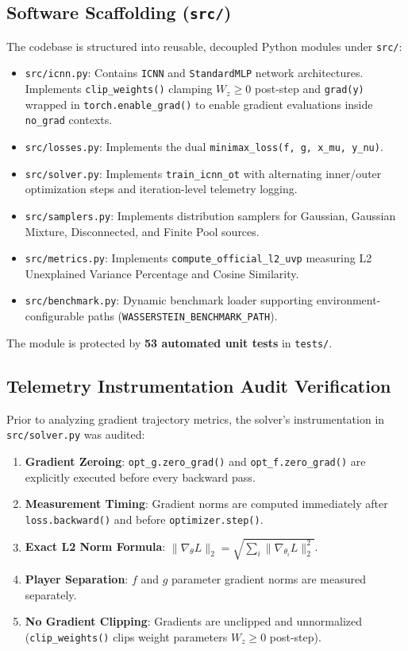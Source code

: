 \documentclass[11pt,a4paper]{article}
\begin{document}
\subsection{Software Scaffolding (\texttt{src/})}
The codebase is structured into reusable, decoupled Python modules under \texttt{src/}:
\begin{itemize}
    \item \texttt{src/icnn.py}: Contains \texttt{ICNN} and \texttt{StandardMLP} network architectures. Implements \texttt{clip\_weights()} clamping $W_z \ge 0$ post-step and \texttt{grad(y)} wrapped in \texttt{torch.enable\_grad()} to enable gradient evaluations inside \texttt{no\_grad} contexts.
    \item \texttt{src/losses.py}: Implements the dual \texttt{minimax\_loss(f, g, x\_mu, y\_nu)}.
    \item \texttt{src/solver.py}: Implements \texttt{train\_icnn\_ot} with alternating inner/outer optimization steps and iteration-level telemetry logging.
    \item \texttt{src/samplers.py}: Implements distribution samplers for Gaussian, Gaussian Mixture, Disconnected, and Finite Pool sources.
    \item \texttt{src/metrics.py}: Implements \texttt{compute\_official\_l2\_uvp} measuring L2 Unexplained Variance Percentage and Cosine Similarity.
    \item \texttt{src/benchmark.py}: Dynamic benchmark loader supporting environment-configurable paths (\texttt{WASSERSTEIN\_BENCHMARK\_PATH}).
\end{itemize}
The module is protected by \textbf{53 automated unit tests} in \texttt{tests/}.

\subsection{Telemetry Instrumentation Audit Verification}
Prior to analyzing gradient trajectory metrics, the solver's instrumentation in \texttt{src/solver.py} was audited:
\begin{enumerate}
    \item \textbf{Gradient Zeroing}: \texttt{opt\_g.zero\_grad()} and \texttt{opt\_f.zero\_grad()} are explicitly executed before every backward pass.
    \item \textbf{Measurement Timing}: Gradient norms are computed immediately after \texttt{loss.backward()} and before \texttt{optimizer.step()}.
    \item \textbf{Exact L2 Norm Formula}: $\|\nabla_\theta L\|_2 = \sqrt{\sum_{i} \|\nabla_{\theta_i} L\|_2^2}$.
    \item \textbf{Player Separation}: $f$ and $g$ parameter gradient norms are measured separately.
    \item \textbf{No Gradient Clipping}: Gradients are unclipped and unnormalized (\texttt{clip\_weights()} clips weight parameters $W_z \ge 0$ post-step).
\end{enumerate}
\end{document}
